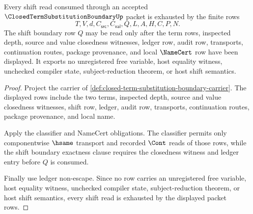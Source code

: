 \begin{theorem}
\label{thm:closed-term-substitution-boundary-shift-ledger-exhaustion}
Every shift read consumed through an accepted $\ClosedTermSubstitutionBoundaryUp$ packet is exhausted by the finite rows
$$
T,V,d,C_{\mathsf{src}},C_{\mathsf{val}},Q,L,A,H,C,P,N.
$$
The shift boundary row $Q$ may be read only after the term rows, inspected depth, source and value closedness witnesses, ledger row, audit row, transports, continuation routes, package provenance, and local $\NameCert$ row have been displayed. It exports no unregistered free variable, host equality witness, unchecked compiler state, subject-reduction theorem, or host shift semantics.
\end{theorem}
\begin{proof}
Project the carrier of \autoref{def:closed-term-substitution-boundary-carrier}. The displayed rows include the two terms, inspected depth, source and value closedness witnesses, shift row, ledger, audit row, transports, continuation routes, package provenance, and local name.

Apply the classifier and NameCert obligations. The classifier permits only componentwise $\hsame$ transport and recorded $\Cont$ reads of those rows, while the shift boundary exactness clause requires the closedness witness and ledger entry before $Q$ is consumed.

Finally use ledger non-escape. Since no row carries an unregistered free variable, host equality witness, unchecked compiler state, subject-reduction theorem, or host shift semantics, every shift read is exhausted by the displayed packet rows.
\end{proof}

